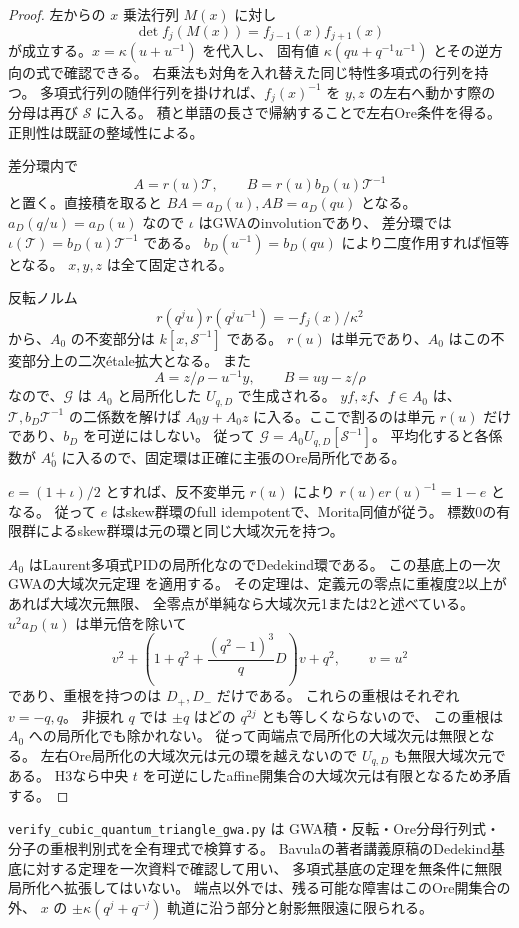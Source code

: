 \begin{proof}
左からの $x$ 乗法行列 $M(x)$ に対し
\[
 \det f_j(M(x))=f_{j-1}(x)f_{j+1}(x)
\]
が成立する。$x=\kappa(u+u^{-1})$ を代入し、
固有値 $\kappa(qu+q^{-1}u^{-1})$ とその逆方向の式で確認できる。
右乗法も対角を入れ替えた同じ特性多項式の行列を持つ。
多項式行列の随伴行列を掛ければ、$f_j(x)^{-1}$ を $y,z$ の左右へ動かす際の
分母は再び $\mathcal S$ に入る。
積と単語の長さで帰納することで左右Ore条件を得る。
正則性は既証の整域性による。

差分環内で
\[
 A=r(u)\mathcal T,\qquad B=r(u)b_D(u)\mathcal T^{-1}
\]
と置く。直接積を取ると $BA=a_D(u),AB=a_D(qu)$ となる。
$a_D(q/u)=a_D(u)$ なので $\iota$ はGWAのinvolutionであり、
差分環では $\iota(\mathcal T)=b_D(u)\mathcal T^{-1}$ である。
$b_D(u^{-1})=b_D(qu)$ により二度作用すれば恒等となる。
$x,y,z$ は全て固定される。

反転ノルム
\[
 r(q^ju)r(q^ju^{-1})=-f_j(x)/\kappa^2
\]
から、$A_0$ の不変部分は $k[x,\mathcal S^{-1}]$ である。
$r(u)$ は単元であり、$A_0$ はこの不変部分上の二次\'etale拡大となる。
また
\[
 A=z/\rho-u^{-1}y,\qquad B=uy-z/\rho
\]
なので、$\mathcal G$ は $A_0$ と局所化した $U_{q,D}$ で生成される。
$yf,zf$、$f\in A_0$ は、$\mathcal T,b_D\mathcal T^{-1}$ の二係数を解けば
$A_0y+A_0z$ に入る。ここで割るのは単元 $r(u)$ だけであり、$b_D$ を可逆にはしない。
従って $\mathcal G=A_0U_{q,D}[\mathcal S^{-1}]$。
平均化すると各係数が $A_0^{\iota}$ に入るので、固定環は正確に主張のOre局所化である。

$e=(1+\iota)/2$ とすれば、反不変単元 $r(u)$ により
$r(u)e r(u)^{-1}=1-e$ となる。
従って $e$ はskew群環のfull idempotentで、Morita同値が従う。
標数0の有限群によるskew群環は元の環と同じ大域次元を持つ。

$A_0$ はLaurent多項式PIDの局所化なのでDedekind環である。
この基底上の一次GWAの大域次元定理
\cite[Theorem 3.1]{BavulaGWAOverview}を適用する。
その定理は、定義元の零点に重複度2以上があれば大域次元無限、
全零点が単純なら大域次元1または2と述べている。
$u^2a_D(u)$ は単元倍を除いて
\[
 v^2+\left(1+q^2+\frac{(q^2-1)^3}{q}D\right)v+q^2,
 \qquad v=u^2
\]
であり、重根を持つのは $D_+,D_-$ だけである。
これらの重根はそれぞれ $v=-q,q$。
非捩れ $q$ では $\pm q$ はどの $q^{2j}$ とも等しくならないので、
この重根は $A_0$ への局所化でも除かれない。
従って両端点で局所化の大域次元は無限となる。
左右Ore局所化の大域次元は元の環を越えないので $U_{q,D}$ も無限大域次元である。
H3なら中央 $t$ を可逆にしたaffine開集合の大域次元は有限となるため矛盾する。
\end{proof}

\texttt{verify\_cubic\_quantum\_triangle\_\allowbreak gwa.py} は
GWA積・反転・Ore分母行列式・分子の重根判別式を全有理式で検算する。
Bavulaの著者講義原稿のDedekind基底に対する定理を一次資料で確認して用い、
多項式基底の定理を無条件に無限局所化へ拡張してはいない。
端点以外では、残る可能な障害はこのOre開集合の外、
$x$ の $\pm\kappa(q^j+q^{-j})$ 軌道に沿う部分と射影無限遠に限られる。
